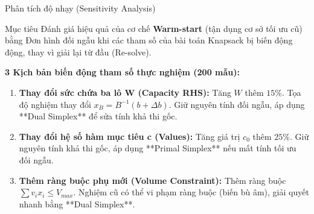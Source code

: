 \documentclass[10pt]{beamer}
\begin{document}
\begin{frame}{Phân tích độ nhạy (Sensitivity Analysis)}
    \begin{block}{Mục tiêu}
        Đánh giá hiệu quả của cơ chế \textbf{Warm-start} (tận dụng cơ sở tối ưu cũ) bằng Đơn hình đối ngẫu khi các tham số của bài toán Knapsack bị biến động động, thay vì giải lại từ đầu (Re-solve).
    \end{block}
    \textbf{3 Kịch bản biến động tham số thực nghiệm (200 mẫu):}
    \begin{enumerate}
        \item \textbf{Thay đổi sức chứa ba lô W (Capacity RHS):} Tăng $W$ thêm $15\%$. Tọa độ nghiệm thay đổi $x_B = B^{-1}(b + \Delta b)$. Giữ nguyên tính đối ngẫu, áp dụng **Dual Simplex** để sửa tính khả thi gốc.
        \item \textbf{Thay đổi hệ số hàm mục tiêu c (Values):} Tăng giá trị $c_0$ thêm $25\%$. Giữ nguyên tính khả thi gốc, áp dụng **Primal Simplex** nếu mất tính tối ưu đối ngẫu.
        \item \textbf{Thêm ràng buộc phụ mới (Volume Constraint):} Thêm ràng buộc $\sum v_i x_i \le V_{max}$. Nghiệm cũ có thể vi phạm ràng buộc (biến bù âm), giải quyết nhanh bằng **Dual Simplex**.
    \end{enumerate}
\end{frame}
\end{document}
